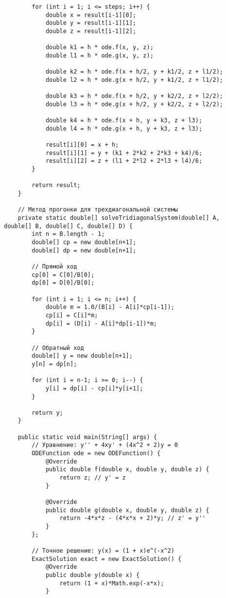 \begin{verbatim}
        for (int i = 1; i <= steps; i++) {
            double x = result[i-1][0];
            double y = result[i-1][1];
            double z = result[i-1][2];

            double k1 = h * ode.f(x, y, z);
            double l1 = h * ode.g(x, y, z);

            double k2 = h * ode.f(x + h/2, y + k1/2, z + l1/2);
            double l2 = h * ode.g(x + h/2, y + k1/2, z + l1/2);

            double k3 = h * ode.f(x + h/2, y + k2/2, z + l2/2);
            double l3 = h * ode.g(x + h/2, y + k2/2, z + l2/2);

            double k4 = h * ode.f(x + h, y + k3, z + l3);
            double l4 = h * ode.g(x + h, y + k3, z + l3);

            result[i][0] = x + h;
            result[i][1] = y + (k1 + 2*k2 + 2*k3 + k4)/6;
            result[i][2] = z + (l1 + 2*l2 + 2*l3 + l4)/6;
        }

        return result;
    }

    // Метод прогонки для трехдиагональной системы
    private static double[] solveTridiagonalSystem(double[] A, double[] B, double[] C, double[] D) {
        int n = B.length - 1;
        double[] cp = new double[n+1];
        double[] dp = new double[n+1];

        // Прямой ход
        cp[0] = C[0]/B[0];
        dp[0] = D[0]/B[0];

        for (int i = 1; i <= n; i++) {
            double m = 1.0/(B[i] - A[i]*cp[i-1]);
            cp[i] = C[i]*m;
            dp[i] = (D[i] - A[i]*dp[i-1])*m;
        }

        // Обратный ход
        double[] y = new double[n+1];
        y[n] = dp[n];

        for (int i = n-1; i >= 0; i--) {
            y[i] = dp[i] - cp[i]*y[i+1];
        }

        return y;
    }

    public static void main(String[] args) {
        // Уравнение: y'' + 4xy' + (4x^2 + 2)y = 0
        ODEFunction ode = new ODEFunction() {
            @Override
            public double f(double x, double y, double z) {
                return z; // y' = z
            }

            @Override
            public double g(double x, double y, double z) {
                return -4*x*z - (4*x*x + 2)*y; // z' = y''
            }
        };

        // Точное решение: y(x) = (1 + x)e^(-x^2)
        ExactSolution exact = new ExactSolution() {
            @Override
            public double y(double x) {
                return (1 + x)*Math.exp(-x*x);
            }


\end{verbatim}
